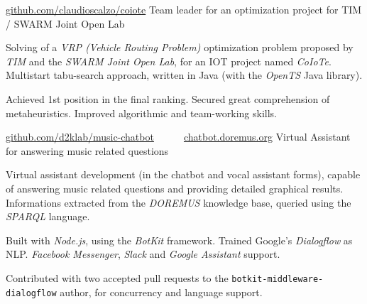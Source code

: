 



\begin{cventries}

	\cvproj
		{\href{https://github.com/claudioscalzo/coiote}{github.com/claudioscalzo/coiote}}
		{Team leader for an optimization project for TIM / SWARM Joint Open Lab}
		{}
		{}
		{
			\begin{cvitems} %
				\item {Solving of a \textit{VRP (Vehicle Routing Problem)} optimization problem proposed by \textit{TIM} and the \textit{SWARM Joint Open Lab}, for an IOT project named \textit{CoIoTe}. Multistart tabu-search approach, written in Java (with the \textit{OpenTS} Java library).}
				\item {Achieved 1st position in the final ranking. Secured great comprehension of metaheuristics. Improved algorithmic and team-working skills.}
			\end{cvitems}
		}

	\cvproj
		{\href{https://github.com/D2KLab/music-chatbot}{github.com/d2klab/music-chatbot}~~~\textbullet~~~\href{https://chatbot.doremus.org}{chatbot.doremus.org}}
		{Virtual Assistant for answering music related questions}
		{}
		{}
		{
			\begin{cvitems} %
				\item {Virtual assistant development (in the chatbot and vocal assistant forms), capable of answering music related questions and providing detailed graphical results. Informations extracted from the \textit{DOREMUS} knowledge base, queried using the \textit{SPARQL} language.}
				\item {Built with \textit{Node.js}, using the \textit{BotKit} framework. Trained Google's \textit{Dialogflow} as NLP. \textit{Facebook Messenger}, \textit{Slack} and \textit{Google Assistant} support.}
				\item {Contributed with two accepted pull requests to the \texttt{botkit-middleware-dialogflow} author, for concurrency and language support.}
			\end{cvitems}
		}
	

\end{cventries}
